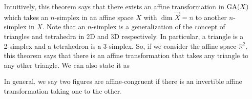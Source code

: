 Intuitively, this theorem says that there exists an affine transformation in
$\operatorname{GA}(X)$ which takes an $n$-simplex in an affine space $X$ with $\dim \vec{X}=n$
to another $n$-simplex in $X$. Note that an $n$-simplex is a generalization of the
concept of triangles and tetrahedra in 2D and 3D respectively. In particular, a
triangle is a 2-simplex and a tetrahedron is a 3-simplex. So, if we consider the
affine space $\mathbb{R}^2$, this theorem says that there is an affine
transformation that takes any triangle to any other triangle. We can also state it
as
\vspace{1ex}

\begin{center}
\end{center}
\vspace{1ex}

\noindent
In general, we say two figures are affine-congruent if there is an invertible
affine transformation taking one to the other.
